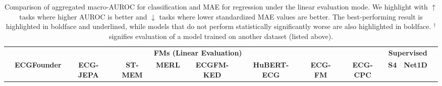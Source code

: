 \documentclass{article}
\begin{document}
            \begin{table}[t]
                \centering
                \tiny
                \setlength{\tabcolsep}{2pt} %
                \caption{Comparison of aggregated macro-AUROC for classification and MAE for regression under the linear evaluation mode. We highlight with $\uparrow$ tasks where higher AUROC is better and $\downarrow$ tasks where lower standardized MAE values are better. The best-performing result is highlighted in boldface and underlined, while models that do not perform statistically significantly worse are also highlighted in boldface. ${}^\dagger$ signifies evaluation of a model trained on another dataset (listed above).}
                \label{tab:linear_evaluation_result}
                \begin{tabular}{lccccccccccc}
                    \toprule
                    & \multicolumn{8}{c}{\textbf{FMs (Linear Evaluation)}} &\multicolumn{2}{c}{\textbf{Supervised}} \\
                    \cmidrule(l){2-9}\cmidrule(l){10-11}
                     & \textbf{ECGFounder} & \textbf{ECG-JEPA} & \textbf{ST-MEM} & \textbf{MERL} & \textbf{ECGFM-KED} & \textbf{HuBERT-ECG} & \textbf{ECG-FM} & \textbf{ECG-CPC} & \textbf{S4} & \textbf{Net1D} \\
                    \midrule
        

\end{tabular}
\end{table}
\end{document}
